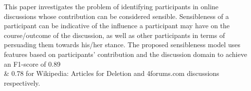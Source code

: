 This paper investigates the problem of identifying participants in online discussions whose contribution can be considered sensible. Sensibleness of a participant can be indicative of the influence a participant may have on the course/outcome of the discussion, as well as other participants in terms of persuading them towards his/her stance. The proposed sensibleness model uses features based on participants' contribution and the discussion domain to achieve an F1-score of 0.89 \\& 0.78 for Wikipedia: Articles for Deletion and 4forums.com discussions respectively.
